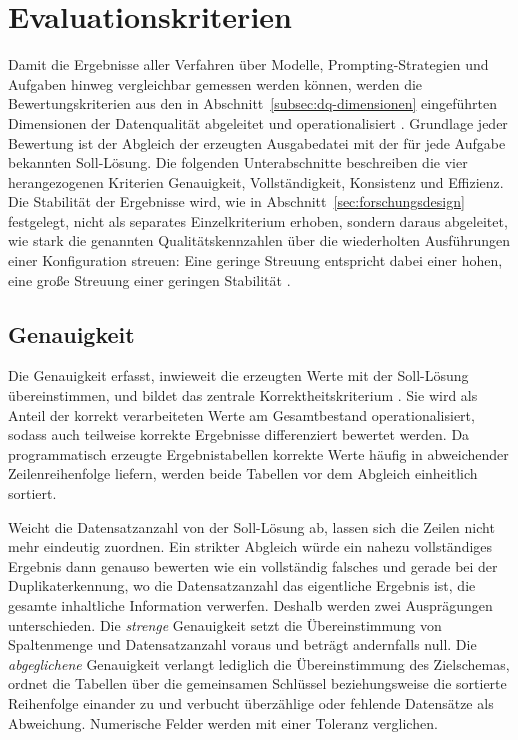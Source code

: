 \section{Evaluationskriterien}
\label{sec:evaluationskriterien}

Damit die Ergebnisse aller Verfahren über Modelle, Prompting-Strategien und Aufgaben hinweg vergleichbar gemessen werden können, werden die Bewertungskriterien aus den in Abschnitt~\ref{subsec:dq-dimensionen} eingeführten Dimensionen der Datenqualität abgeleitet und operationalisiert \autocite{ridzuanReviewDataQuality2024}. Grundlage jeder Bewertung ist der Abgleich der erzeugten Ausgabedatei mit der für jede Aufgabe bekannten Soll-Lösung. Die folgenden Unterabschnitte beschreiben die vier herangezogenen Kriterien Genauigkeit, Vollständigkeit, Konsistenz und Effizienz. Die Stabilität der Ergebnisse wird, wie in Abschnitt~\ref{sec:forschungsdesign} festgelegt, nicht als separates Einzelkriterium erhoben, sondern daraus abgeleitet, wie stark die genannten Qualitätskennzahlen über die wiederholten Ausführungen einer Konfiguration streuen: Eine geringe Streuung entspricht dabei einer hohen, eine große Streuung einer geringen Stabilität \autocite{zhaoSurveyLargeLanguage2026,hassaniRoleChatGPTData2023}.

\subsection{Genauigkeit}
\label{subsec:genauigkeit}

Die Genauigkeit erfasst, inwieweit die erzeugten Werte mit der Soll-Lösung übereinstimmen, und bildet das zentrale Korrektheitskriterium \autocite{ridzuanReviewDataQuality2024,rangineniReviewEnhancingData2023}. Sie wird als Anteil der korrekt verarbeiteten Werte am Gesamtbestand operationalisiert, sodass auch teilweise korrekte Ergebnisse differenziert bewertet werden. Da programmatisch erzeugte Ergebnistabellen korrekte Werte häufig in abweichender Zeilenreihenfolge liefern, werden beide Tabellen vor dem Abgleich einheitlich sortiert.

Weicht die Datensatzanzahl von der Soll-Lösung ab, lassen sich die Zeilen nicht mehr eindeutig zuordnen. Ein strikter Abgleich würde ein nahezu vollständiges Ergebnis dann genauso bewerten wie ein vollständig falsches und gerade bei der Duplikaterkennung, wo die Datensatzanzahl das eigentliche Ergebnis ist, die gesamte inhaltliche Information verwerfen. Deshalb werden zwei Ausprägungen unterschieden. Die \emph{strenge} Genauigkeit setzt die Übereinstimmung von Spaltenmenge und Datensatzanzahl voraus und beträgt andernfalls null. Die \emph{abgeglichene} Genauigkeit verlangt lediglich die Übereinstimmung des Zielschemas, ordnet die Tabellen über die gemeinsamen Schlüssel beziehungsweise die sortierte Reihenfolge einander zu und verbucht überzählige oder fehlende Datensätze als Abweichung. Numerische Felder werden mit einer Toleranz verglichen.

